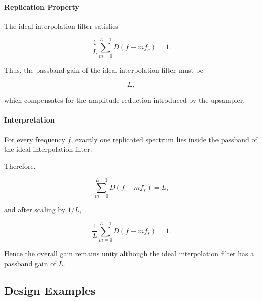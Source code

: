 \paragraph{Replication Property}

The ideal interpolation filter satisfies

\[
\boxed{
\frac1L
\sum_{m=0}^{L-1}
D(f-mf_s)=1.
}
\]

Thus, the passband gain of the ideal interpolation filter must be

\[
L,
\]

which compensates for the amplitude reduction introduced by the
upsampler.

\paragraph{Interpretation}

For every frequency \(f\), exactly one replicated spectrum lies inside the
passband of the ideal interpolation filter.

Therefore,

\[
\sum_{m=0}^{L-1}D(f-mf_s)=L,
\]

and after scaling by \(1/L\),

\[
\frac1L
\sum_{m=0}^{L-1}
D(f-mf_s)=1.
\]

Hence the overall gain remains unity although the ideal interpolation filter
has a passband gain of \(L\).
\subsection{Design Examples}
